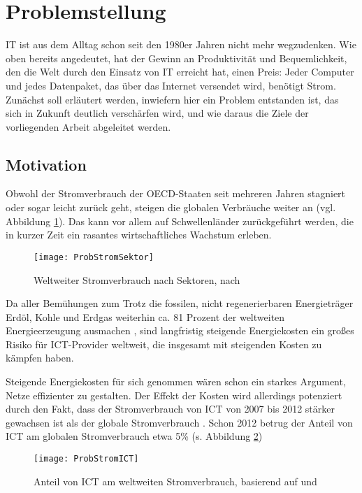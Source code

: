 
\section{Problemstellung}

IT ist aus dem Alltag schon seit den 1980er Jahren nicht mehr wegzudenken. Wie oben bereits angedeutet, hat der Gewinn an Produktivität und Bequemlichkeit, den die Welt durch den Einsatz von IT erreicht hat, einen Preis: Jeder Computer und jedes Datenpaket, das über das Internet versendet wird, benötigt Strom. Zunächst soll erläutert werden, inwiefern hier ein Problem entstanden ist, das sich in Zukunft deutlich verschärfen wird, und wie daraus die Ziele der vorliegenden Arbeit abgeleitet werden.

\subsection{Motivation}
Obwohl der Stromverbrauch der OECD-Staaten seit mehreren Jahren stagniert oder sogar leicht zurück geht, steigen die globalen Verbräuche weiter an (vgl. Abbildung \ref{fig:ProbStromSektor}). Das kann vor allem auf  Schwellenländer zurückgeführt werden, die in kurzer Zeit ein rasantes wirtschaftliches Wachstum erleben.

\begin{figure}[htb]
	\centering
	\texttt{[image: ProbStromSektor]}
	\caption{Weltweiter Stromverbrauch nach Sektoren, nach \cite{eia2016}}
	\label{fig:ProbStromSektor}
\end{figure}
Da aller Bemühungen zum Trotz die fossilen, nicht regenerierbaren Energieträger Erdöl, Kohle und Erdgas weiterhin ca. 81 Prozent der weltweiten Energieerzeugung ausmachen \cite{statista}, sind langfristig steigende Energiekosten \cite[40\psqq]{iea2015} ein großes Risiko für ICT-Provider weltweit, die insgesamt mit steigenden Kosten zu kämpfen haben.

Steigende Energiekosten für sich genommen wären schon ein starkes Argument, Netze effizienter zu gestalten.  Der Effekt der Kosten wird allerdings potenziert durch den Fakt, dass der Stromverbrauch von ICT von 2007 bis 2012 stärker gewachsen ist als der globale Stromverbrauch \cite[9]{vanhedde}. Schon 2012 betrug der Anteil von ICT am globalen Stromverbrauch etwa 5\% (s. Abbildung \ref{fig:ProbStromICT})

\begin{figure}[htb]
	\centering
	\texttt{[image: ProbStromICT]}
	\caption{Anteil von ICT am weltweiten Stromverbrauch, basierend auf \cite{eia2016} und \cite{vanhsheet}}
	\label{fig:ProbStromICT}
\end{figure}


